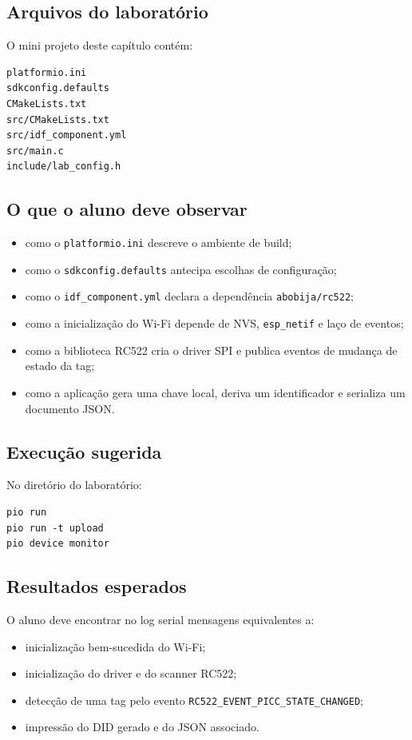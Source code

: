 \subsection{Arquivos do laboratório}
O mini projeto deste capítulo contém:
\begin{verbatim}
platformio.ini
sdkconfig.defaults
CMakeLists.txt
src/CMakeLists.txt
src/idf_component.yml
src/main.c
include/lab_config.h
\end{verbatim}

\subsection{O que o aluno deve observar}
\begin{itemize}[leftmargin=*]
  \item como o \texttt{platformio.ini} descreve o ambiente de build;
  \item como o \texttt{sdkconfig.defaults} antecipa escolhas de configuração;
  \item como o \texttt{idf\_component.yml} declara a dependência \texttt{abobija/rc522};
  \item como a inicialização do Wi-Fi depende de NVS, \texttt{esp\_netif} e laço de eventos;
  \item como a biblioteca RC522 cria o driver SPI e publica eventos de mudança de estado da tag;
  \item como a aplicação gera uma chave local, deriva um identificador e serializa um documento JSON.
\end{itemize}

\subsection{Execução sugerida}
No diretório do laboratório:
\begin{verbatim}
pio run
pio run -t upload
pio device monitor
\end{verbatim}

\subsection{Resultados esperados}
O aluno deve encontrar no log serial mensagens equivalentes a:
\begin{itemize}[leftmargin=*]
  \item inicialização bem-sucedida do Wi-Fi;
  \item inicialização do driver e do scanner RC522;
  \item detecção de uma tag pelo evento \texttt{RC522\_EVENT\_PICC\_STATE\_CHANGED};
  \item impressão do DID gerado e do JSON associado.
\end{itemize}

